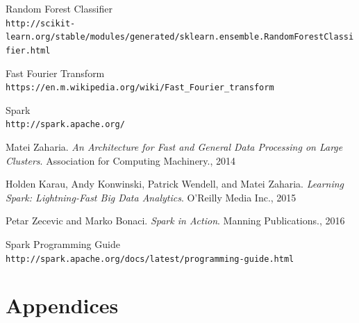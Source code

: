 \documentclass{neu_handout}
\begin{document}
\begin{thebibliography}{9}
Random Forest Classifier
\\\texttt{http://scikit-learn.org/stable/modules/generated/sklearn.ensemble.RandomForestClassifier.html}

Fast Fourier Transform
\\\texttt{https://en.m.wikipedia.org/wiki/Fast\_Fourier\_transform}

Spark
\\\texttt{http://spark.apache.org/}


 Matei Zaharia. \textsl{An Architecture for Fast and General Data Processing on
Large Clusters}. Association for Computing Machinery., 2014

 Holden Karau, Andy Konwinski, Patrick Wendell, and Matei Zaharia. \textsl{Learning Spark: Lightning-Fast Big Data Analytics}. O'Reilly Media Inc., 2015

 Petar Zecevic and Marko Bonaci. \textsl{Spark in Action}. Manning
Publications., 2016

Spark Programming Guide
\\\texttt{http://spark.apache.org/docs/latest/programming-guide.html}

\end{thebibliography}

\newpage

\appendix
\section*{Appendices}
\end{document}
